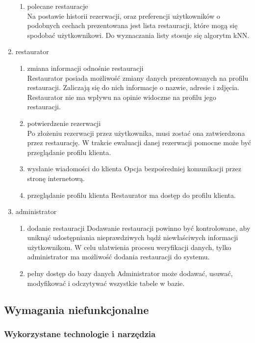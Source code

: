 \documentclass{article}
\begin{document}
\begin{enumerate}
\begin{enumerate}
	\item polecane restauracje \\
	Na postawie historii rezerwacji, oraz preferencji użytkowników o podobnych cechach prezentowana jest lista restauracji, które mogą się spodobać użytkownikowi. Do wyznaczania listy stosuje się algorytm kNN.
\end{enumerate}
\item restaurator
\begin{enumerate}
	\item zmiana informacji odnośnie restauracji \\
	Restaurator posiada możliwość zmiany danych prezentowanych na profilu restauracji. Zaliczają się do nich informacje o nazwie, adresie i zdjęcia. Restaurator nie ma wpływu na opinie widoczne na profilu jego restauracji.
	\item potwierdzenie rezerwacji \\
	Po złożeniu rezerwacji przez użytkownika, musi zostać ona zatwierdzona przez restaurację. W trakcie ewaluacji danej rezerwacji pomocne może być przeglądanie profilu klienta.
	\item wysłanie wiadomości do klienta
	Opcja bezpośredniej komunikacji przez stronę internetową.
	\item przeglądanie profilu klienta
	Restaurator ma dostęp do profilu klienta.
\end{enumerate}
\item administrator
\begin{enumerate}
	\item dodanie restauracji
	Dodawanie restauracji powinno być kontrolowane, aby uniknąć udostępniania nieprawdziwych bądź niewłaściwych informacji użytkownikom. W celu ułatwienia procesu weryfikacji danych, tylko administrator ma możliwość dodania restauracji do systemu.
	\item pełny dostęp do bazy danych
	Administrator może dodawać, usuwać, modyfikować i odczytywać wszystkie tabele w bazie. 
\end{enumerate}
\end{enumerate}


\subsection{Wymagania niefunkcjonalne}

\subsubsection{Wykorzystane technologie i narzędzia}
\end{document}

